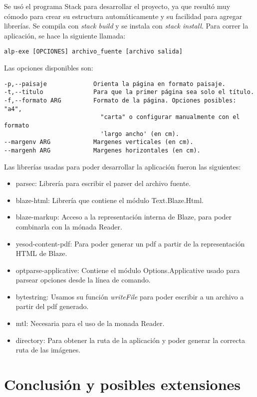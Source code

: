 \documentclass{article}
\begin{document}
Se usó el programa Stack para desarrollar el proyecto, ya que resultó muy cómodo para crear su estructura automáticamente y su facilidad para agregar librerías. Se compila con \emph{stack build} y se instala con \emph{stack install}. Para correr la aplicación, se hace la siguiente llamada:
\begin{verbatim}
alp-exe [OPCIONES] archivo_fuente [archivo salida]
\end{verbatim}
Las opciones disponibles son:
\begin{verbatim}
-p,--paisaje             Orienta la página en formato paisaje.
-t,--titulo              Para que la primer página sea solo el título.
-f,--formato ARG         Formato de la página. Opciones posibles: "a4",
                           "carta" o configurar manualmente con el formato
                           'largo ancho' (en cm).
--margenv ARG            Margenes verticales (en cm).
--margenh ARG            Margenes horizontales (en cm).
\end{verbatim}
Las librerías usadas para poder desarrollar la aplicación fueron las siguientes:
\begin{itemize}
    \item parsec: Librería para escribir el parser del archivo fuente.
    \item blaze-html: Librería que contiene el módulo Text.Blaze.Html.
    \item blaze-markup: Acceso a la representación interna de Blaze, para poder combinarla con la mónada Reader.
    \item yesod-content-pdf: Para poder generar un pdf a partir de la representación HTML de Blaze.
    \item optparse-applicative: Contiene el módulo Options.Applicative usado para parsear opciones desde la línea de comando.
    \item bytestring: Usamos su función \emph{writeFile} para poder escribir a un archivo a partir del pdf generado.
    \item mtl: Necesaria para el uso de la monada Reader.
    \item directory: Para obtener la ruta de la aplicación y poder generar la correcta ruta de las imágenes.
\end{itemize}

\section{Conclusión y posibles extensiones}
\end{document}
